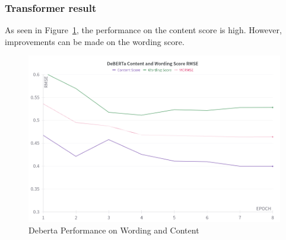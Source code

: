 \subsubsection{Transformer result}
As seen in Figure~\ref{fig:deberta_performance}, the performance on the content score is high. However, improvements can be made on the wording score.

\begin{figure}[H]
    \includegraphics[keepaspectratio, width=\textwidth]{img/Deberta-performance.png}
\caption{Deberta Performance on Wording and Content}
\label{fig:deberta_performance}
\end{figure}